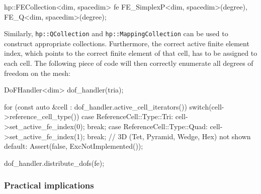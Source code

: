 \documentclass{ansarticle-preprint}
\begin{document}
\begin{c++}
hp::FECollection<dim, spacedim> fe
  {FE_SimplexP<dim, spacedim>(degree), FE_Q<dim, spacedim>(degree)};
\end{c++}

Similarly, \texttt{hp::QCollection} and \texttt{hp::MappingCollection} can be used
to construct appropriate collections. Furthermore, the correct active
finite element index, which points to the correct
finite element of that cell, has to be assigned to each cell. The
following piece of code will then correctly enumerate all degrees of
freedom on the mesh:

\begin{c++}
DoFHandler<dim> dof_handler(tria);

for (const auto &cell : dof_handler.active_cell_iterators())
  switch(cell->reference_cell_type())
    {
      case ReferenceCell::Type::Tri:  cell->set_active_fe_index(0); break;
      case ReferenceCell::Type::Quad: cell->set_active_fe_index(1); break;
      // 3D (Tet, Pyramid, Wedge, Hex) not shown
      default: Assert(false, ExcNotImplemented());
    }

dof_handler.distribute_dofs(fe);
\end{c++}

\subsubsection{Practical implications}
\end{document}
